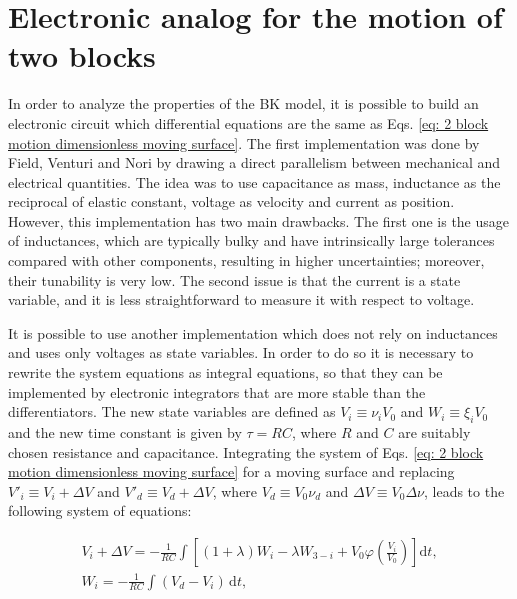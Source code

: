 \section{Electronic analog for the motion of two blocks}
\label{sec: electronic analog}

In order to analyze the properties of the BK model, it is possible to build an electronic circuit
which differential equations are the same as Eqs. \ref{eq: 2 block motion dimensionless moving surface}.
The first implementation was done by Field, Venturi and Nori \cite{ref:fvn} by drawing a direct parallelism
between mechanical and electrical quantities. The idea was to use capacitance as mass,
inductance as the reciprocal of elastic constant, voltage as velocity and current as position.
However, this implementation has two main drawbacks. The first one is the usage of inductances, which are typically
bulky and have intrinsically large tolerances compared with other components, resulting in higher uncertainties; moreover,
their tunability is very low. The second issue is that the current is a state variable, and it is less straightforward
to measure it with respect to voltage.

It is possible to use another implementation \cite{ref:electronic_analog} which does not rely on inductances
and uses only voltages as state variables. In order to do so it is necessary to rewrite the system equations
as integral equations, so that they can be implemented by electronic integrators that are more stable than
the differentiators. The new state variables are defined as $V_i\equiv \nu_i V_0$ and $W_i\equiv \xi_i V_0$ and
the new time constant is given by $\tau=RC$, where $R$ and $C$ are suitably chosen resistance and capacitance.
Integrating the system of Eqs. \ref{eq: 2 block motion dimensionless moving surface} for a moving surface and replacing
$V'_i\equiv V_i+\Delta V$ and $V'_d\equiv V_d+\Delta V$, where $V_d\equiv V_0\nu_d$ and $\Delta V\equiv V_0\Delta\nu$,
leads to the following system of equations:

\begin{equation}
    \label{eq: 2 block motion electronic}
    \begin{gathered}
        V_i+\Delta V=-\frac{1}{RC}\int\left[ (1+\lambda)W_i - \lambda W_{3-i}+V_0\varphi\left(\frac{V_i}{V_0}\right) \right]\text{d}t ,\\[10pt]
        W_i=-\frac{1}{RC}\int(V_d-V_i)\,\text{d}t,
    \end{gathered}
\end{equation}

